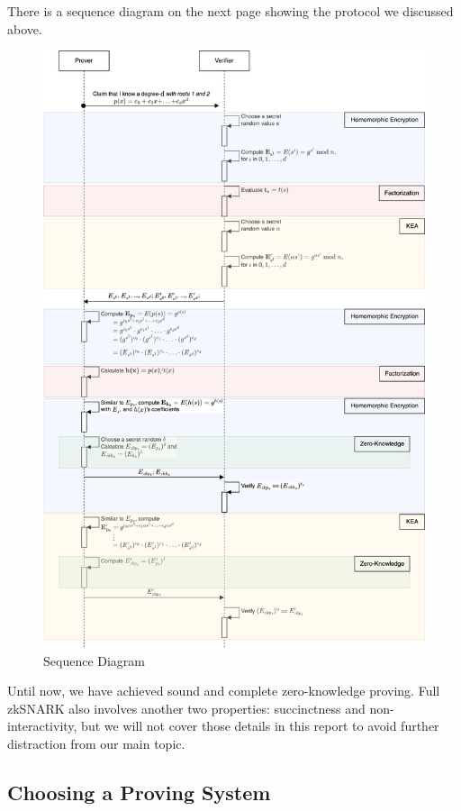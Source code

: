 \documentclass[
]{report}
\begin{document}
There is a sequence diagram on the next page showing the protocol we discussed
above.

\begin{figure}
\centering
\includegraphics{zksnark.png}
\caption{Sequence Diagram}
\end{figure}

Until now, we have achieved sound and complete zero-knowledge proving.
Full zkSNARK also involves another two properties: succinctness
and non-interactivity, but we will not cover those details in this
report to avoid further distraction from our main topic.

\subsection{Choosing a Proving System}
\end{document}
